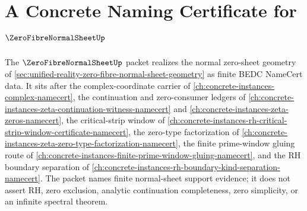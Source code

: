 \chapter{A Concrete Naming Certificate for $\ZeroFibreNormalSheetUp$}
\label{ch:concrete-instances-zero-fibre-normal-sheet-namecert}

The $\ZeroFibreNormalSheetUp$ packet realizes the normal zero-sheet geometry of \autoref{sec:unified-reality-zero-fibre-normal-sheet-geometry} as finite BEDC NameCert data. It sits after the complex-coordinate carrier of \autoref{ch:concrete-instances-complex-namecert}, the continuation and zero-consumer ledgers of \autoref{ch:concrete-instances-zeta-continuation-witness-namecert} and \autoref{ch:concrete-instances-zeta-zeros-namecert}, the critical-strip window of \autoref{ch:concrete-instances-rh-critical-strip-window-certificate-namecert}, the zero-type factorization of \autoref{ch:concrete-instances-zeta-zero-type-factorization-namecert}, the finite prime-window gluing route of \autoref{ch:concrete-instances-finite-prime-window-gluing-namecert}, and the RH boundary separation of \autoref{ch:concrete-instances-rh-boundary-kind-separation-namecert}. The packet names finite normal-sheet support evidence; it does not assert RH, zero exclusion, analytic continuation completeness, zero simplicity, or an infinite spectral theorem.

